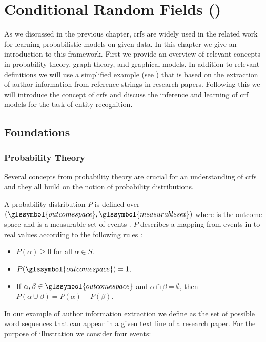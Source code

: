 \chapter{Conditional Random Fields ()}\label{cha:crfs}

As we discussed in the previous chapter, \glspl{crf} are widely used in the related work for learning probabilistic models on given data.
In this chapter we give an introduction to this framework.
First we provide an overview of relevant concepts in probability theory, graph theory, and graphical models.
In addition to relevant definitions we will use a simplified example (see ) that is based on the extraction of author information from reference strings in research papers.
Following this we will introduce the concept of \glspl{crf} and discuss the inference and learning of \gls{crf} models for the task of entity recognition.

\section{Foundations}\label{sec:foundations}
\subsection{Probability Theory}\label{subsec:probability-theory}
Several concepts from probability theory are crucial for an understanding of \glspl{crf} and they all build on the notion of \glspl{probability distribution}.

A \gls{probability distribution} $P$ is defined over $(\glssymbol{outcome space},\glssymbol{measurable set})$ where  is the \gls{outcome space} and  is a \gls{measurable set} of \glspl{event} \citep{koller2009probabilistic}.
$P$ describes a mapping from events in  to real values according to the following rules \citep{koller2009probabilistic}:
\begin{itemize}
  \item $P(\alpha)\geq 0 $ for all $ \alpha \in S$.
  \item $P(\glssymbol{outcome space})=1$.
  \item If $\alpha,\beta\in \glssymbol{outcome space}$ and $\alpha\cap\beta = \emptyset$, then $P(\alpha\cup\beta)=P(\alpha)+P(\beta)$.
\end{itemize}
In our example of author information extraction we define  as the set of possible word sequences that can appear in a given text line of a research paper.
For the purpose of illustration we consider four events:

